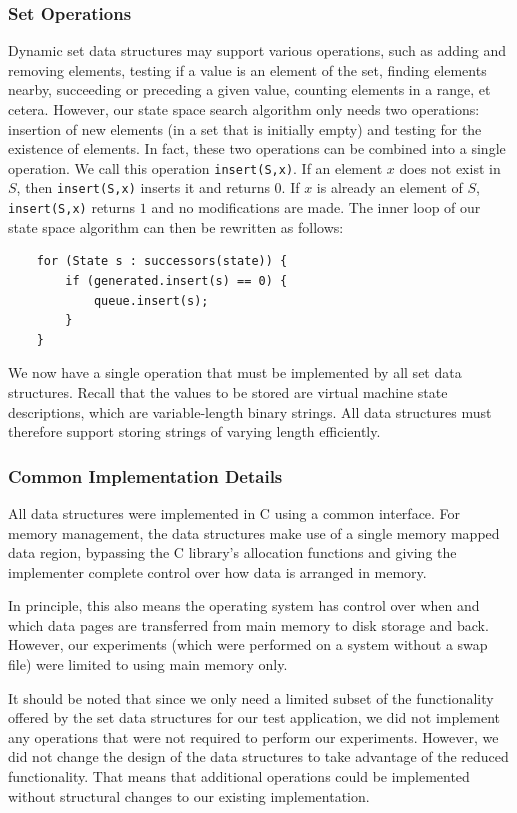 \documentclass{acm_proc_article-sp}
\begin{document}
\subsubsection{Set Operations}
Dynamic set data structures may support various operations, such as adding and removing elements, testing if a value is an element of the set, finding elements nearby, succeeding or preceding a given value, counting elements in a range, et cetera. However, our state space search algorithm only needs two operations: insertion of new elements (in a set that is initially empty) and testing for the existence of elements. In fact, these two operations can be combined into a single operation. We call this operation \verb#insert(S,x)#. If an element $x$ does not exist in $S$, then \verb#insert(S,x)# inserts it and returns $0$. If $x$ is already an element of $S$, \verb#insert(S,x)# returns $1$ and no modifications are made. The inner loop of our state space algorithm can then be rewritten as follows:
\begin{verbatim}
    for (State s : successors(state)) {
        if (generated.insert(s) == 0) {
            queue.insert(s);
        }
    }
\end{verbatim}

We now have a single operation that must be implemented by all set data structures. Recall that the values to be stored are virtual machine state descriptions, which are variable-length binary strings. All data structures must therefore support storing strings of varying length efficiently.

\subsubsection{Common Implementation Details}
All data structures were implemented in C using a common interface.
For memory management, the data structures make use of a single memory mapped
data region, bypassing the C library's allocation functions and giving the
implementer complete control over how data is arranged in memory.

In principle, this also means the operating system has control over when and
which data pages are transferred from main memory to disk storage and back.
However, our experiments (which were performed on a system without a swap file)
were limited to using main memory only.

It should be noted that since we only need a limited subset of the functionality
offered by the set data structures for our test application, we did not
implement any operations that were not required to perform our experiments.
However, we did not change the design of the data structures to take advantage
of the reduced functionality. That means that additional operations could be
implemented without structural changes to our existing implementation.
\end{document}
